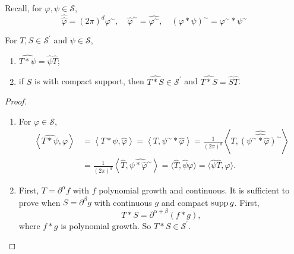 \begin{enumerate}
	\noindent Recall, for $\varphi,\psi \in \mathcal{S}$,
	\begin{equation*}
		\widehat{\widehat{\varphi}} = (2\pi)^d\varphi^\sim,\quad \widehat{\varphi}^\sim = \widehat{\varphi^\sim},\quad (\varphi * \psi)^{\sim}=\varphi^{\sim} * \psi^{\sim}
	\end{equation*}
	\begin{prop}
		For $T,S \in\mathcal{S}^\prime$ and $\psi \in \mathcal{S}$,
		\begin{enumerate}
			\item $\widehat{T * \psi} = \widehat{\psi}\widehat{T}$;
			\item if $S$ is with compact support, then $\widehat{T * S} \in \mathcal{S}^\prime$ and $\widehat{T * S} = \widehat{S}\widehat{T}$.
		\end{enumerate}
	\end{prop}
	\begin{proof}
		\begin{enumerate}
			\item For $\varphi \in \mathcal{S}$,
			\begin{equation*}
				\begin{aligned}
					\left\langle\widehat{T * \psi}, \varphi\right\rangle & =\left\langle T * \psi, \widehat{\varphi}\right\rangle=\left\langle T, \psi^{\sim} * \widehat{\varphi}\right\rangle=\frac{1}{(2 \pi)^d}\left\langle T,\widehat{\widehat{\left(\psi^{\sim} * \widehat{\varphi}\right)^\sim}}\right\rangle \\
					& =\frac{1}{(2 \pi)^d}\left\langle\widehat{T},\widehat{\psi * \widehat{\varphi}^{\sim}}\right\rangle=\langle\widehat{T}, \widehat{\psi} \varphi\rangle=\langle\widehat{\psi} \widehat{T}, \varphi\rangle .
				\end{aligned}
			\end{equation*}

			\item First, $T=\partial^\alpha f$ with $f$ polynomial growth and continuous. It is sufficient to prove when $S = \partial^\beta g$ with continuous $g$ and compact $\operatorname{supp} g$. First,
			\begin{equation*}
				T * S = \partial^{\alpha + \beta}(f*g),
			\end{equation*}
			where $f*g$ is polynomial growth. So $T * S \in \mathcal{S}^\prime$. 


\end{enumerate}
\end{proof}
\end{enumerate}
